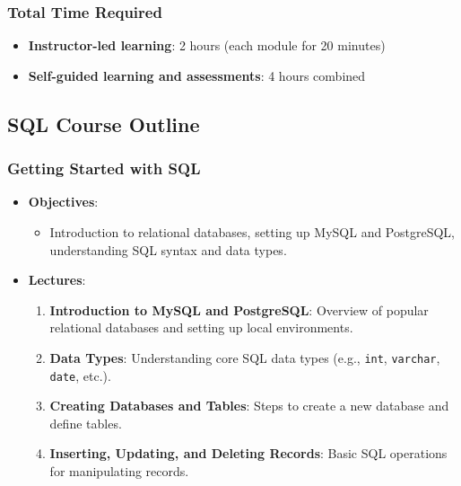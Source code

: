 \documentclass[
  letterpaper,
  DIV=11,
  numbers=noendperiod]{scrartcl}
\providecommand{\tightlist}{%
  \setlength{\itemsep}{0pt}\setlength{\parskip}{0pt}}\usepackage{longtable,booktabs,array}
\begin{document}
\subsubsection{Total Time Required}\label{total-time-required}

\begin{itemize}
\tightlist
\item
  \textbf{Instructor-led learning}: 2 hours (each module for 20 minutes)
\item
  \textbf{Self-guided learning and assessments}: 4 hours combined
\end{itemize}

\subsection{SQL Course Outline}\label{sql-course-outline}

\subsubsection{Getting Started with SQL}\label{getting-started-with-sql}

\begin{itemize}
\tightlist
\item
  \textbf{Objectives}:

  \begin{itemize}
  \tightlist
  \item
    Introduction to relational databases, setting up MySQL and
    PostgreSQL, understanding SQL syntax and data types.
  \end{itemize}
\item
  \textbf{Lectures}:

  \begin{enumerate}
  \def\labelenumi{\arabic{enumi}.}
  \tightlist
  \item
    \textbf{Introduction to MySQL and PostgreSQL}: Overview of popular
    relational databases and setting up local environments.
  \item
    \textbf{Data Types}: Understanding core SQL data types (e.g.,
    \texttt{int}, \texttt{varchar}, \texttt{date}, etc.).
  \item
    \textbf{Creating Databases and Tables}: Steps to create a new
    database and define tables.
  \item
    \textbf{Inserting, Updating, and Deleting Records}: Basic SQL
    operations for manipulating records.
  \end{enumerate}
\end{itemize}
\end{document}
